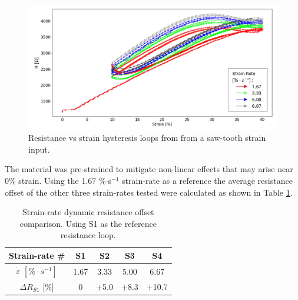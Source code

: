 \begin{figure}[H]
	\centering
	\includegraphics[width=\linewidth]{Figures/hysteresis_strain_varSpeeds_ledge_corrected.jpg}
	\caption{Resistance vs strain hysteresis loops from from a saw-tooth strain input.}
	\label{fig:saw-tooth-hysteresis-loops}
\end{figure}
The material was pre-strained to mitigate non-linear effects that may arise near 0\% strain. Using the 1.67 \%$\cdot$s$^{-1}$ strain-rate as a reference the average resistance offset of the other three strain-rates tested were calculated as shown in Table \ref{tab:rel-dR-strain-rate}.
\begin{table}[H]
	\centering
	\caption{Strain-rate dynamic resistance offset comparison. Using S1 as the reference resistance loop.}
	\label{tab:rel-dR-strain-rate}
	\begin{tabular}{c|cccc}
		Strain-rate \# & S1 & S2 & S3 & S4 \\
		\hline
		$\dot\varepsilon$ $[\%\cdot s^{-1}]$ & 1.67 & 3.33 & 5.00 & 6.67 \\
		\hline
		$\Delta R_{S1}$ [\%] & 0 & +5.0 & +8.3 & +10.7 \\
	\end{tabular}
\end{table}


